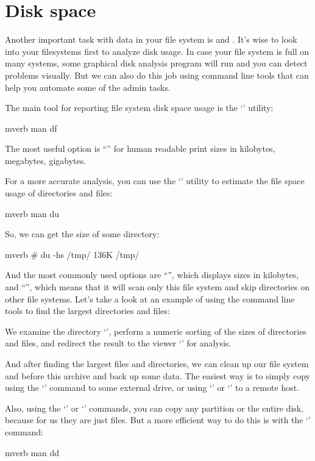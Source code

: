 \section*{Disk space} %

Another important task with data in your file system is  and
. It's wise to look into your filesystems first to analyze
disk usage. In case your file system is full on many systems, some graphical
disk analysis program will run and you can detect problems visually. But we can
also do this job using command line tools that can help you automate some of
the admin tasks.

The main tool for reporting file system disk space usage is the `'
utility:
\begin{code}{mverb}
man df
\end{code}
The most useful option is ``'' for human readable
print sizes in kilobytes, megabytes, gigabytes.

For a more accurate analysis, you can use the `' utility to estimate
the file space usage of directories and files:
\begin{code}{mverb}
man du
\end{code}
So, we can get the size of some directory:
\begin{code}{mverb}
# du -hs /tmp/
136K	/tmp/
\end{code}
And the most commonly used options are ``'', which displays sizes in
kilobytes, and ``'', which means that it will scan only this file system
and skip directories on other file systems. Let's take a look at an example of
using the command line tools to find the largest directories and files:
We examine the directory `', perform a numeric sorting of the sizes of
directories and files, and redirect the result to the viewer `'
for analysis.

And after finding the largest files and directories, we can clean up our file
system and before this archive and back up some data. The easiest way is
to simply copy using the `' command to some external drive, or
using `' or `' to a remote host.

Also, using the `' or `' commands, you can copy any partition
or the entire disk, because for us they are just files. But a more efficient way
to do this is with the `' command:
\begin{code}{mverb}
man dd
\end{code}

